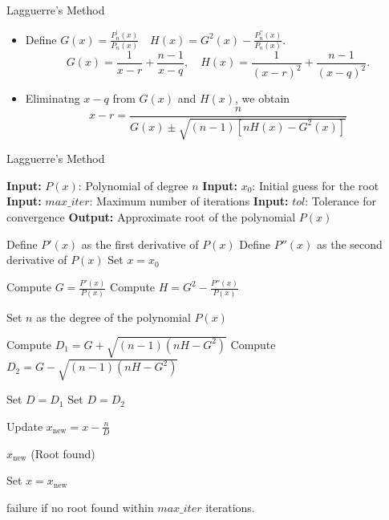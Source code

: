 \documentclass{beamer}
\begin{document}
\begin{frame}{Lagguerre's Method}
  \begin{itemize}
    \item Define $G(x)=\frac{P_n^{\prime}(x)}{P_n(x)} \quad H(x)=G^2(x)-\frac{P_n^{\prime \prime}(x)}{P_n(x)}$. 
    $$
G(x)=\frac{1}{x-r}+\frac{n-1}{x-q}, \quad H(x) =\frac{1}{(x-r)^2}+\frac{n-1}{(x-q)^2}.
$$
\item Eliminatng $x-q$ from $G(x)$ and $H(x)$, we obtain
$$
x-r=\frac{n}{G(x) \pm \sqrt{(n-1)\left[n H(x)-G^2(x)\right]}}
$$
  \end{itemize}
\end{frame}
\begin{frame}{Lagguerre's Method}
  \begin{multicols}{2}
    
\tiny
  \begin{algorithmic}
  \State \textbf{Input:} $P(x)$: Polynomial of degree $n$
  \State \textbf{Input:} $x_0$: Initial guess for the root
  \State \textbf{Input:} $max\_iter$: Maximum number of iterations
  \State \textbf{Input:} $tol$: Tolerance for convergence
  \State \textbf{Output:} Approximate root of the polynomial $P(x)$
  
  \State Define $P'(x)$ as the first derivative of $P(x)$
  \State Define $P''(x)$ as the second derivative of $P(x)$
  \State Set $x = x_0$
      
      \State Compute $G = \frac{P'(x)}{P(x)}$
      \State Compute $H = G^2 - \frac{P''(x)}{P(x)}$
      
      \State Set $n$ as the degree of the polynomial $P(x)$
      
      \State Compute $D_1 = G + \sqrt{(n-1)\left(nH - G^2\right)}$
      \State Compute $D_2 = G - \sqrt{(n-1)\left(nH - G^2\right)}$
      
          \State Set $D = D_1$
      \Else
          \State Set $D = D_2$
      \EndIf
      
      \State Update $x_{\text{new}} = x - \frac{n}{D}$
      
          \State \Return $x_{\text{new}}$ (Root found)
      \EndIf
      
      \State Set $x = x_{\text{new}}$
  \EndFor
  
  \State \Return failure if no root found within $max\_iter$ iterations.
  
  \end{algorithmic}
\end{multicols}

\end{frame}
\end{document}

